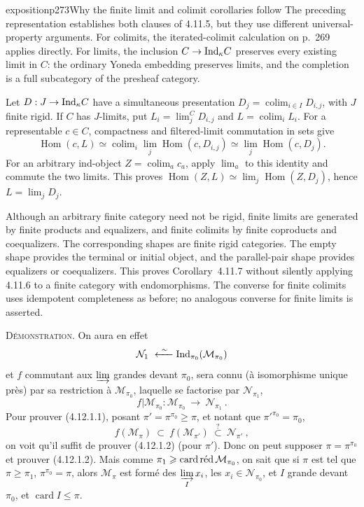 \begin{dcomment}{exposition}{p273}{Why the finite limit and colimit corollaries follow}
The preceding representation establishes both clauses of 4.11.5, but they use different universal-property arguments. For colimits, the iterated-colimit calculation on p.~269 applies directly. For limits, the inclusion $C\to\Ind_\kappa C$ preserves every existing limit in $C$: the ordinary Yoneda embedding preserves limits, and the completion is a full subcategory of the presheaf category.

Let $D:J\to\Ind_\kappa C$ have a simultaneous presentation $D_j=\operatorname{colim}_{i\in I}D_{i,j}$, with $J$ finite rigid. If $C$ has $J$-limits, put $L_i=\lim_j^C D_{i,j}$ and $L=\operatorname{colim}_i L_i$. For a representable $c\in C$, compactness and filtered-limit commutation in sets give
\[
 \operatorname{Hom}(c,L)
 \simeq\operatorname{colim}_i\lim_j\operatorname{Hom}(c,D_{i,j})
 \simeq\lim_j\operatorname{Hom}(c,D_j).
\]
For an arbitrary ind-object $Z=\operatorname{colim}_a c_a$, apply $\lim_a$ to this identity and commute the two limits. This proves $\operatorname{Hom}(Z,L)\simeq\lim_j\operatorname{Hom}(Z,D_j)$, hence $L=\lim_j D_j$.

Although an arbitrary finite category need not be rigid, finite limits are generated by finite products and equalizers, and finite colimits by finite coproducts and coequalizers. The corresponding shapes are finite rigid categories. The empty shape provides the terminal or initial object, and the parallel-pair shape provides equalizers or coequalizers. This proves Corollary~4.11.7 without silently applying 4.11.6 to a finite category with endomorphisms. The converse for finite colimits uses idempotent completeness as before; no analogous converse for finite limits is asserted.
\end{dcomment}


\textsc{Démonstration}. On aura en effet
\[
\mathcal{N}_1 \ \xleftarrow{\ \sim\ } \Ind_{\pi_0}(\mathcal{M}_{\pi_0})
\]
et $f$ commutant aux $\varinjlim$ grandes devant $\pi_0$, sera connu (à isomorphisme unique près) par sa restriction à $\mathcal{M}_{\pi_0}$, laquelle se factorise par $\mathcal{N}_{\pi_1}$,
\[
f|\mathcal{M}_{\pi_0} : \mathcal{M}_{\pi_0} \ \longrightarrow \ \mathcal{N}_{\pi_1} \ .
\]
Pour prouver (4.12.1.1), posant $\pi' = \pi^{\pi_0} \geqslant \pi$, et notant que $\pi'^{\pi_0} = \pi_0$,
\[
f(\mathcal{M}_\pi) \ \subset \ f(\mathcal{M}_{\pi'}) \ \overset{?}{\subset} \ \mathcal{N}_{\pi'} \ ,
\]
on voit qu'il suffit de prouver (4.12.1.2) (pour $\pi'$). Donc on peut supposer $\pi = \pi^{\pi_0}$ et prouver (4.12.1.2). Mais comme $\pi_1 \geqslant \cardred \mathcal{M}_{\pi_0}$, on sait que si $\pi$ est tel que $\pi \geqslant \pi_1$, $\pi^{\pi_0} = \pi$, alors $\mathcal{M}_\pi$ est formé des $\varinjlim\limits_{I} x_i$, les $x_i \in \mathcal{N}_{\pi_0}$, et $I$ grande devant $\pi_0$, et $\operatorname{card} I \leqslant \pi$.

